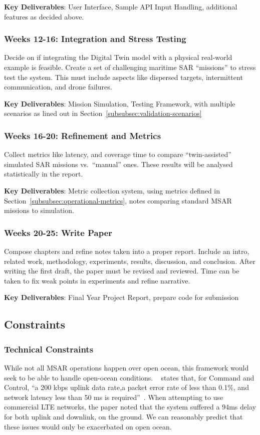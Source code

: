 \textbf{Key Deliverables}: User Interface, Sample API Input Handling, additional features as decided above.

\subsubsection{Weeks 12-16: Integration and Stress Testing}\label{subsubsec:-integration-and-stress-testing}
Decide on if integrating the Digital Twin model with a physical real-world example is feasible.
Create a set of challenging maritime SAR “missions” to stress test the system.
This must include aspects like dispersed targets, intermittent communication, and drone failures.

\textbf{Key Deliverables}: Mission Simulation, Testing Framework, with multiple scenarios as lined out in Section~\ref{subsubsec:validation-scenarios}

\subsubsection{Weeks 16-20: Refinement and Metrics}\label{subsubsec:refinement-and-metrics}
Collect metrics like latency, and coverage time to compare “twin-assisted” simulated SAR missions vs.\ ``manual'' ones.
These results will be analysed statistically in the report.

\textbf{Key Deliverables}: Metric collection system, using metrics defined in Section~\ref{subsubsec:operational-metrics}, notes comparing standard MSAR missions to simulation.

\subsubsection{Weeks 20-25: Write Paper}\label{subsubsec:write-paper}
Compose chapters and refine notes taken into a proper report.
Include an intro, related work, methodology, experiments, results, discussion, and conclusion.
After writing the first draft, the paper must be revised and reviewed.
Time can be taken to fix weak points in experiments and refine narrative.

\textbf{Key Deliverables}: Final Year Project Report, prepare code for submission

\subsection{Constraints}\label{subsec:constraints}

\subsubsection{Technical Constraints}
While not all MSAR operations happen over open ocean, this framework would seek to be able to handle open-ocean conditions.
~\cite{s21082848} states that, for Command and Control, ``a 200 kbps uplink data rate,a packet error rate of less than 0.1\%, and network latency less than 50 ms is required''~\cite[p.13]{s21082848}.
When attempting to use commercial LTE networks, the paper noted that the system suffered a 94ms delay for both uplink and downlink, on the ground.
We can reasonably predict that these issues would only be exacerbated on open ocean.

